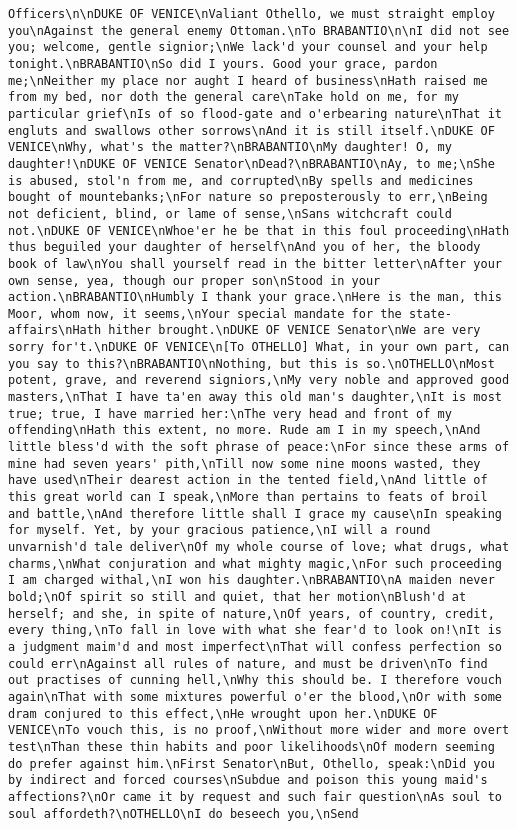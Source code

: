\begin{verbatim}
Officers\n\nDUKE OF VENICE\nValiant Othello, we must straight employ you\nAgainst the general enemy Ottoman.\nTo BRABANTIO\n\nI did not see you; welcome, gentle signior;\nWe lack'd your counsel and your help tonight.\nBRABANTIO\nSo did I yours. Good your grace, pardon me;\nNeither my place nor aught I heard of business\nHath raised me from my bed, nor doth the general care\nTake hold on me, for my particular grief\nIs of so flood-gate and o'erbearing nature\nThat it engluts and swallows other sorrows\nAnd it is still itself.\nDUKE OF VENICE\nWhy, what's the matter?\nBRABANTIO\nMy daughter! O, my daughter!\nDUKE OF VENICE Senator\nDead?\nBRABANTIO\nAy, to me;\nShe is abused, stol'n from me, and corrupted\nBy spells and medicines bought of mountebanks;\nFor nature so preposterously to err,\nBeing not deficient, blind, or lame of sense,\nSans witchcraft could not.\nDUKE OF VENICE\nWhoe'er he be that in this foul proceeding\nHath thus beguiled your daughter of herself\nAnd you of her, the bloody book of law\nYou shall yourself read in the bitter letter\nAfter your own sense, yea, though our proper son\nStood in your action.\nBRABANTIO\nHumbly I thank your grace.\nHere is the man, this Moor, whom now, it seems,\nYour special mandate for the state-affairs\nHath hither brought.\nDUKE OF VENICE Senator\nWe are very sorry for't.\nDUKE OF VENICE\n[To OTHELLO] What, in your own part, can you say to this?\nBRABANTIO\nNothing, but this is so.\nOTHELLO\nMost potent, grave, and reverend signiors,\nMy very noble and approved good masters,\nThat I have ta'en away this old man's daughter,\nIt is most true; true, I have married her:\nThe very head and front of my offending\nHath this extent, no more. Rude am I in my speech,\nAnd little bless'd with the soft phrase of peace:\nFor since these arms of mine had seven years' pith,\nTill now some nine moons wasted, they have used\nTheir dearest action in the tented field,\nAnd little of this great world can I speak,\nMore than pertains to feats of broil and battle,\nAnd therefore little shall I grace my cause\nIn speaking for myself. Yet, by your gracious patience,\nI will a round unvarnish'd tale deliver\nOf my whole course of love; what drugs, what charms,\nWhat conjuration and what mighty magic,\nFor such proceeding I am charged withal,\nI won his daughter.\nBRABANTIO\nA maiden never bold;\nOf spirit so still and quiet, that her motion\nBlush'd at herself; and she, in spite of nature,\nOf years, of country, credit, every thing,\nTo fall in love with what she fear'd to look on!\nIt is a judgment maim'd and most imperfect\nThat will confess perfection so could err\nAgainst all rules of nature, and must be driven\nTo find out practises of cunning hell,\nWhy this should be. I therefore vouch again\nThat with some mixtures powerful o'er the blood,\nOr with some dram conjured to this effect,\nHe wrought upon her.\nDUKE OF VENICE\nTo vouch this, is no proof,\nWithout more wider and more overt test\nThan these thin habits and poor likelihoods\nOf modern seeming do prefer against him.\nFirst Senator\nBut, Othello, speak:\nDid you by indirect and forced courses\nSubdue and poison this young maid's affections?\nOr came it by request and such fair question\nAs soul to soul affordeth?\nOTHELLO\nI do beseech you,\nSend 
\end{verbatim}
